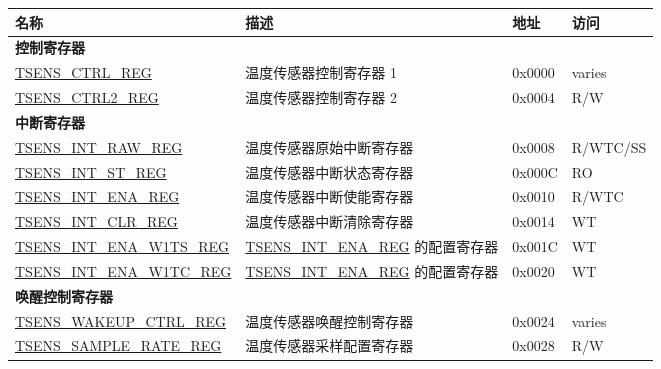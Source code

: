 \begin{longtable}{ | p{5cm} | p{7.5cm} | p{1.3cm} | p{2cm} | }
\hline\rowcolor{lightgray}
\textbf{名称} & \textbf{描述} & \textbf{地址} & \textbf{访问} \\ \hline
\endhead
\multicolumn{4}{|l|}{\textbf{控制寄存器}} \\ \hline
\hyperref[regdesc:TSENSCTRLREG]{TSENS\_CTRL\_REG} & 温度传感器控制寄存器 1 & 0x0000 & varies \\ \hline
\hyperref[regdesc:TSENSCTRL2REG]{TSENS\_CTRL2\_REG} & 温度传感器控制寄存器 2 & 0x0004 & R/W \\ \hline
\multicolumn{4}{|l|}{\textbf{中断寄存器}} \\ \hline
\hyperref[regdesc:TSENSINTRAWREG]{TSENS\_INT\_RAW\_REG} & 温度传感器原始中断寄存器 & 0x0008 & R/WTC/SS \\ \hline
\hyperref[regdesc:TSENSINTSTREG]{TSENS\_INT\_ST\_REG} & 温度传感器中断状态寄存器  & 0x000C & RO \\ \hline
\hyperref[regdesc:TSENSINTENAREG]{TSENS\_INT\_ENA\_REG} & 温度传感器中断使能寄存器 & 0x0010 & R/WTC \\ \hline
\hyperref[regdesc:TSENSINTCLRREG]{TSENS\_INT\_CLR\_REG} & 温度传感器中断清除寄存器 & 0x0014 & WT \\ \hline
\hyperref[regdesc:TSENSINTENAW1TSREG]{TSENS\_INT\_ENA\_W1TS\_REG} & \hyperref[regdesc:TSENSINTENAREG]{TSENS\_INT\_ENA\_REG} 的配置寄存器 & 0x001C & WT \\ \hline
\hyperref[regdesc:TSENSINTENAW1TCREG]{TSENS\_INT\_ENA\_W1TC\_REG} & \hyperref[regdesc:TSENSINTENAREG]{TSENS\_INT\_ENA\_REG} 的配置寄存器 & 0x0020 & WT \\ \hline
\multicolumn{4}{|l|}{\textbf{唤醒控制寄存器}} \\ \hline
\hyperref[regdesc:TSENSWAKEUPCTRLREG]{TSENS\_WAKEUP\_CTRL\_REG} & 温度传感器唤醒控制寄存器 & 0x0024 & varies \\ \hline
\hyperref[regdesc:TSENSSAMPLERATEREG]{TSENS\_SAMPLE\_RATE\_REG} & 温度传感器采样配置寄存器 & 0x0028 & R/W \\ \hline
\end{longtable}
